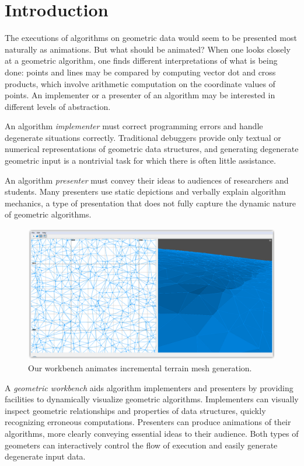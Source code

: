 \section{Introduction}

The executions of algorithms on geometric data would seem to be presented most
naturally as animations. But what should be animated? When one looks closely
at a geometric algorithm, one finds different interpretations of what is being
done: points and lines may be compared by computing vector dot and cross
products, which involve arithmetic computation on the coordinate values of
points. An implementer or a presenter of an algorithm may be interested in
different levels of abstraction.

An algorithm \emph{implementer} must correct programming errors and handle
degenerate situations correctly. Traditional debuggers provide only textual or
numerical representations of geometric data structures, and generating
degenerate geometric input is a nontrivial task for which there is often little
assistance. 

An algorithm \emph{presenter} must convey their ideas to audiences of
researchers and students. Many presenters use static depictions and verbally
explain algorithm mechanics, a type of presentation that does not fully capture
the dynamic nature of geometric algorithms.

\begin{figure}[htb]
	\centering
	\includegraphics[width=\textwidth]{figures/currentstate-2}
	\caption{Our workbench animates incremental terrain mesh generation.} 
	\label{fig:currentstate}
\end{figure}

A \emph{geometric workbench} aids algorithm implementers and presenters by
providing facilities to dynamically visualize geometric algorithms. Implementers
can visually inspect geometric relationships and properties of data structures,
quickly recognizing erroneous computations. Presenters can produce
animations of their algorithms, more clearly conveying essential
ideas to their audience. Both types of geometers can interactively control the
flow of execution and easily generate degenerate input data.

